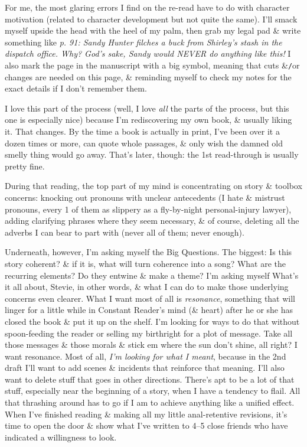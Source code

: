 \documentclass{article}
\numberwithin{equation}{section}
\begin{document}
For me, the most glaring errors I find on the re-read have to do with character motivation (related to character development but not quite the same). I'll smack myself upside the head with the heel of my palm, then grab my legal pad \& write something like \textit{p. 91: Sandy Hunter filches a buck from Shirley's stash in the dispatch office. Why? God's sake, Sandy would NEVER do anything like this!} I also mark the page in the manuscript with a big symbol, meaning that cuts \&{\tt/}or changes are needed on this page, \& reminding myself to check my notes for the exact details if I don't remember them.

I love this part of the process (well, I love \textit{all} the parts of the process, but this one is especially nice) because I'm rediscovering my own book, \& usually liking it. That changes. By the time a book is actually in print, I've been over it a dozen times or more, can quote whole passages, \& only wish the damned old smelly thing would go away. That's later, though: the 1st read-through is usually pretty fine.

During that reading, the top part of my mind is concentrating on story \& toolbox concerns: knocking out pronouns with unclear antecedents (I hate \& mistrust pronouns, every 1 of them as slippery as a fly-by-night personal-injury lawyer), adding clarifying phrases where they seem necessary, \& of course, deleting all the adverbs I can bear to part with (never all of them; never enough).

Underneath, however, I'm asking myself the Big Questions. The biggest: Is this story coherent? \& if it is, what will turn coherence into a song? What are the recurring elements? Do they entwine \& make a theme? I'm asking myself What's it all about, Stevie, in other words, \& what I can do to make those underlying concerns even clearer. What I want most of all is \textit{resonance}, something that will linger for a little while in Constant Reader's mind (\& heart) after he or she has closed the book \& put it up on the shelf. I'm looking for ways to do that without spoon-feeding the reader or selling my birthright for a plot of message. Take all those messages \& those morals \& stick em where the sun don't shine, all right? I want resonance. Most of all, \textit{I'm looking for what I meant}, because in the 2nd draft I'll want to add scenes \& incidents that reinforce that meaning. I'll also want to delete stuff that goes in other directions. There's apt to be a lot of that stuff, especially near the beginning of a story, when I have a tendency to flail. All that thrashing around has to go if I am to achieve anything like a unified effect. When I've finished reading \& making all my little anal-retentive revisions, it's time to open the door \& show what I've written to 4--5 close friends who have indicated a willingness to look.
\end{document}
